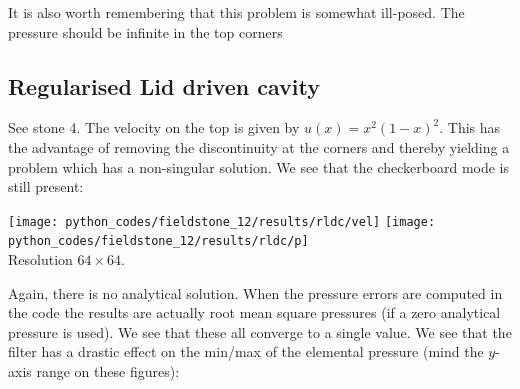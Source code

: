 It is also worth remembering that this problem is somewhat ill-posed. 
The pressure should be infinite in the top corners




\newpage
\subsection*{Regularised Lid driven cavity}

See stone 4. The velocity on the top is given by $u(x)=x^2(1-x)^2$.
This has the advantage of removing the discontinuity at the corners and 
thereby yielding a problem which has a non-singular solution.
We see that the checkerboard mode is still present:

\begin{center}
\texttt{[image: python\_codes/fieldstone\_12/results/rldc/vel]}
\texttt{[image: python\_codes/fieldstone\_12/results/rldc/p]}\\
{\captionfont Resolution $64\times 64$.}
\end{center}

Again, there is no analytical solution. When the pressure errors are computed in the code
the results are actually root mean square pressures (if a zero analytical pressure 
is used). We see that these all converge to a single value.
We see that the filter has a drastic effect on the min/max 
of the elemental pressure (mind the $y$-axis range on these figures): 

